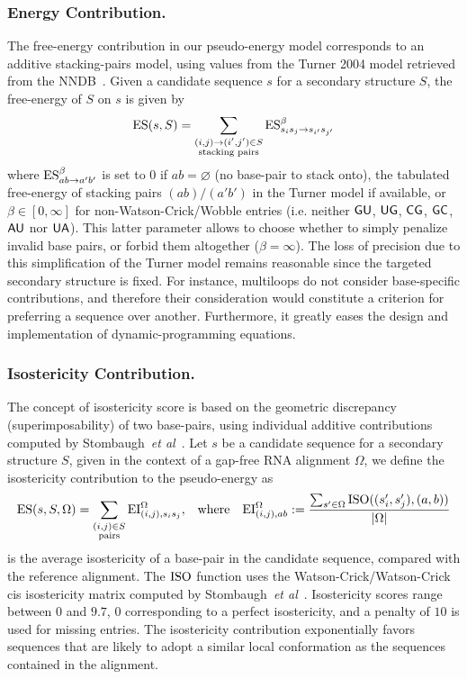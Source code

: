 \subsubsection{Energy Contribution.}
The free-energy contribution in our pseudo-energy model corresponds to an additive stacking-pairs model, using values from the Turner 2004 model retrieved from the NNDB~\cite{Turner2010}. Given a candidate sequence $s$ for a secondary structure $S$, the free-energy of $S$ on $s$ is given by
\begin{align*}
  \text{ES}(s,S) = \sum_{\substack{(i,j)\to (i',j')\in S\\ \text{stacking pairs}}}\text{ES}^{\beta}_{s_is_j\to s_{i'}s_{j'}} 
\end{align*}
where $\text{ES}^{\beta}_{ab\to a'b'}$ is set to $0$ if $ab=\varnothing$ (no base-pair to stack onto), the tabulated free-energy of stacking pairs $(ab)/(a'b')$ in the Turner model if available, or $\beta\in[0,\infty]$ for non-Watson-Crick/Wobble entries (i.e. neither ${\sf{G}}{\sf{U}}$, ${\sf{U}}{\sf{G}}$, ${\sf{C}}{\sf{G}}$, ${\sf{G}}{\sf{C}}$, ${\sf{A}}{\sf{U}}$ nor ${\sf{U}}{\sf{A}}$). This latter parameter allows to choose whether to simply penalize invalid base pairs, or forbid them altogether ($\beta = \infty$).
The loss of precision due to this simplification of the Turner model remains reasonable since the targeted secondary structure is fixed. For instance, multiloops do not consider base-specific contributions, and therefore their consideration would constitute a criterion for preferring a sequence over another. Furthermore, it greatly eases the design and implementation of dynamic-programming equations. 
\subsubsection{Isostericity Contribution.}
The concept of isostericity score is based on the geometric discrepancy (superimposability) of two base-pairs, using individual additive contributions computed by Stombaugh~\emph{et al}~\cite{Stombaugh2009}. Let $s$ be a candidate sequence for a secondary structure $S$, given in the context of a gap-free RNA alignment $\Omega$,  we define the isostericity contribution to the pseudo-energy as
\begin{align*}
  \text{ES}(s,S,\Omega) &= \sum_{\substack{(i,j)\in S\\ \text{pairs}}}\text{EI}^{\Omega}_{(i,j),s_i s_j}, & \text{where}&& 	\text{EI}^{\Omega}_{(i,j),ab}:=
	\frac{
		\sum_{s'\in\Omega}
			\text{\text{ISO}}((s_i',s_j'),(a,b))}
{		
		|\Omega|
	}
\end{align*}
is the average isostericity of a base-pair in the candidate sequence, compared with the reference alignment.
The $\text{ISO}$ function uses the {Watson-Crick/Watson-Crick} cis isostericity matrix computed by Stombaugh~\emph{et al}~\cite{Stombaugh2009}. Isostericity scores range between $0$ and $9.7$, $0$ corresponding to a perfect isostericity, and a penalty of $10$ is used for missing entries.
The isostericity contribution exponentially favors sequences that are likely to adopt a similar local conformation as the sequences contained in the alignment.

